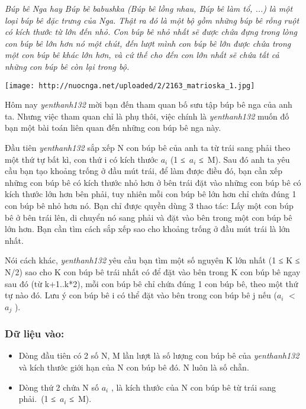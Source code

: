 



\emph{    Búp bê Nga hay Búp bê babushka (Búp bê lồng nhau, Búp bê làm tổ, ...) là một loại búp bê đặc trưng của Nga. Thật ra đó là một bộ gồm những búp bê rỗng ruột có kích thước từ lớn đến nhỏ. Con búp bê nhỏ nhất sẽ được chứa đựng trong lòng con búp bê lớn hơn nó một chút, đến lượt mình con búp bê lớn được chứa trong một con búp bê khác lớn hơn, và cứ thế cho đến con lớn nhất sẽ chứa tất cả những con búp bê còn lại trong bộ.   }


\texttt{[image: http://nuocnga.net/uploaded/2/2163\_matrioska\_1.jpg]}

   Hôm nay   \emph{    yenthanh132   }   mời bạn đến tham quan bố sưu tập búp bê nga của anh ta. Nhưng việc tham quan chỉ là phụ thôi, việc chính là   \emph{    yenthanh132   }   muốn đố bạn một bài toán liên quan đến những con búp bê nga này.  

   Đầu tiên   \emph{    yenthanh132   }   sắp xếp N con búp bê của anh ta từ trái sang phải theo một thứ tự bất kì, con thứ i có kích thước $a_{i}$   (1 ≤ $a_{i}$   ≤ M). Sau đó anh ta yêu cầu bạn tạo khoảng trống ở đầu mút trái, để làm được điều đó, bạn cần xếp những con búp bê có kích thước nhỏ hơn ở bên trái đặt vào những con búp bê có kích thước lớn hơn bên phải, tuy nhiên mỗi con búp bê lớn hơn chỉ chứa đúng 1 con búp bê nhỏ hơn nó. Bạn chỉ được quyền dùng 3 thao tác: Lấy một con búp bê ở bên trái lên, di chuyển nó sang phải và       đặt vào bên trong      một con búp bê lớn hơn. Bạn cần tìm cách sắp xếp sao cho khoảng trống ở đầu mút trái là lớn nhất.  

   Nói cách khác,   \emph{    yenthanh132   }   yêu cầu bạn tìm một số nguyên K lớn nhất (1 ≤ K ≤ N/2) sao cho K con búp bê trái nhất có để đặt vào bên trong K con búp bê ngay sau đó (từ k+1..k*2), mỗi con búp bê chỉ chứa đúng 1 con búp bê, theo một thứ tự nào đó. Lưu ý con búp bê i có thể đặt vào bên trong con búp bê j nếu ($a_{i}$   $<$ $a_{j}$   ).  

\subsubsection{   Dữ liệu vào:  }
\begin{itemize}
	\item     Dòng đầu tiên có 2 số N, M lần lượt là số lượng con búp bê của    \emph{     yenthanh132    }    và kích thước giới hạn của N con búp bê đó. N luôn là số chẵn.   
	\item     Dòng thứ 2 chứa N số $a_{i}$    , là kích thước của N con búp bê từ trái sang phải. (1 ≤ $a_{i}$    ≤ M).   
\end{itemize}

